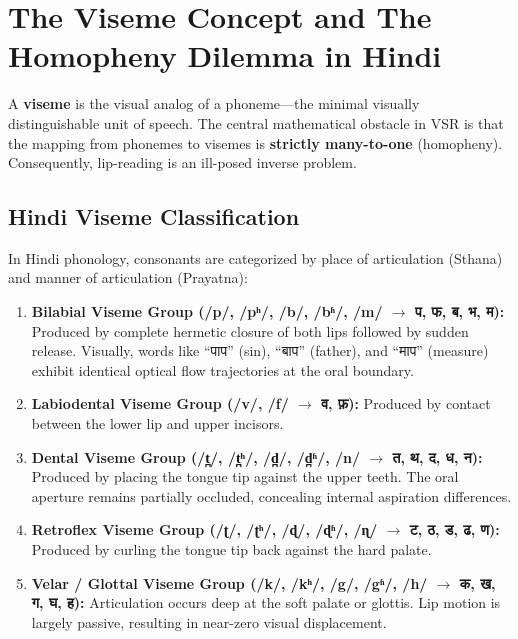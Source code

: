 \documentclass[11pt,a4paper]{report}
\begin{document}
\section{The Viseme Concept and The Homopheny Dilemma in Hindi}
A \textbf{viseme} is the visual analog of a phoneme—the minimal visually distinguishable unit of speech. The central mathematical obstacle in VSR is that the mapping from phonemes to visemes is \textbf{strictly many-to-one} (homopheny). Consequently, lip-reading is an ill-posed inverse problem.

\subsection{Hindi Viseme Classification}
In Hindi phonology, consonants are categorized by place of articulation (Sthana) and manner of articulation (Prayatna):
\begin{enumerate}
    \item \textbf{Bilabial Viseme Group (/p/, /pʰ/, /b/, /bʱ/, /m/ $\to$ प, फ, ब, भ, म):} Produced by complete hermetic closure of both lips followed by sudden release. Visually, words like ``पाप'' (sin), ``बाप'' (father), and ``माप'' (measure) exhibit identical optical flow trajectories at the oral boundary.
    \item \textbf{Labiodental Viseme Group (/v/, /f/ $\to$ व, फ़):} Produced by contact between the lower lip and upper incisors.
    \item \textbf{Dental Viseme Group (/t̪/, /t̪ʰ/, /d̪/, /d̪ʱ/, /n/ $\to$ त, थ, द, ध, न):} Produced by placing the tongue tip against the upper teeth. The oral aperture remains partially occluded, concealing internal aspiration differences.
    \item \textbf{Retroflex Viseme Group (/ʈ/, /ʈʰ/, /ɖ/, /ɖʱ/, /ɳ/ $\to$ ट, ठ, ड, ढ, ण):} Produced by curling the tongue tip back against the hard palate.
    \item \textbf{Velar / Glottal Viseme Group (/k/, /kʰ/, /g/, /gʱ/, /h/ $\to$ क, ख, ग, घ, ह):} Articulation occurs deep at the soft palate or glottis. Lip motion is largely passive, resulting in near-zero visual displacement.
\end{enumerate}
\end{document}
